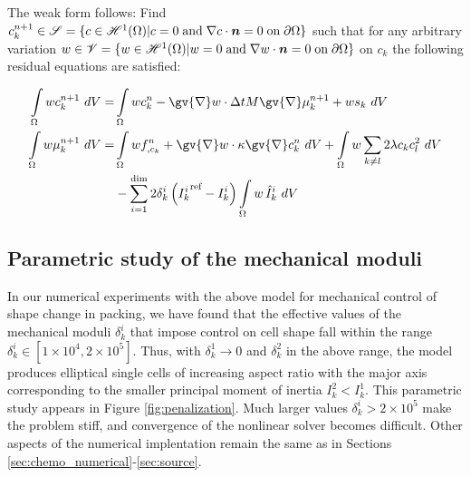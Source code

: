 \documentclass{article}
\newcommand{\grad}[1]{\gv{\nabla} #1}
\def\bn{\mbox{\boldmath$ n$}}
\begin{document}
The weak form follows: Find $c^{n+1}_k \in \mathscr{S} = \{c\in \mathscr{H}^1(\Omega)\vert c = 0\;\text{and}\; \nabla c \cdot\bn = 0 \;\text{on}\; \partial\Omega\}$ such that for any arbitrary variation $w \in \mathscr{V} = \{w\in \mathscr{H}^1(\Omega)\vert w = 0\;\text{and}\; \nabla w \cdot\bn = 0 \;\text{on}\; \partial\Omega\}$ on $c_k$ the following residual equations  are satisfied:

\begin{align}
\int\limits_{\Omega}   w c_k^{n+1} ~dV
=&\int\limits_{\Omega}   w  c_k^{n} - \grad w \cdot \Delta t M \grad \mu_k^{n+1} + ws_k ~dV\nonumber\\
\int\limits_{\Omega}   w  \mu_{k}^{n+1}  ~dV 
=&\int\limits_{\Omega}  w  f_{,c_k}^{n} + \grad w \cdot \kappa \grad c_k^{n} ~dV + \int\limits_\Omega w \sum_{k\ne l}2\lambda  c_k c_l^2  ~dV \nonumber\\
&- \sum_{i=1}^\text{dim} 2\delta_k^i \left({I_k^i} ^\text{ref}- I_k^i\right)\int\limits_\Omega w\, \hat{I}^i_k ~dV
\label{equ:anisotropy_weak} 
\end{align}

\subsection{Parametric study of the mechanical moduli}
In our numerical experiments with the above model for mechanical control of shape change in packing, we have found that the effective values of the mechanical moduli $\delta^i_k$ that impose control on cell shape fall within the range $\delta^i_k \in [1\times 10^4, 2\times 10^5]$. Thus, with $\delta^1_k \to 0$ and $\delta^2_k$ in the above range, the model produces elliptical single cells of increasing aspect ratio with the major axis corresponding to the smaller principal moment of inertia $I^2_k < I^1_k$. This parametric study appears in Figure \ref{fig:penalization}. Much larger values  $\delta^i_k > 2\times 10^5$ make the problem stiff, and convergence of the nonlinear solver becomes difficult. Other aspects of the numerical implentation remain the same as in Sections \ref{sec:chemo_numerical}-\ref{sec:source}. 

\end{document}
